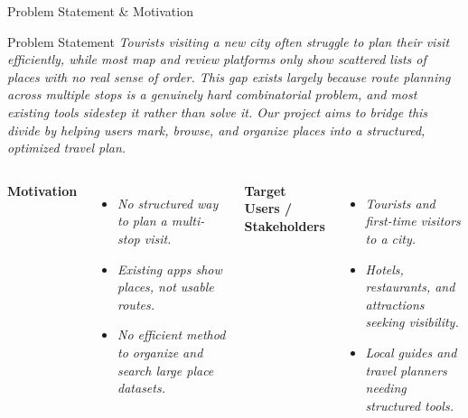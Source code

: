 \documentclass[aspectratio=169,10pt]{beamer}
\newcommand{\placeholder}[1]{\textit{\color{GEUGrey}#1}}
\begin{document}
\begin{frame}{Problem Statement \& Motivation}
\begin{block}{Problem Statement}
\placeholder{Tourists visiting a new city often struggle to plan their visit efficiently, while most map and review platforms only show scattered lists of places with no real sense of order. This gap exists largely because route planning across multiple stops is a genuinely hard combinatorial problem, and most existing tools sidestep it rather than solve it. Our project aims to bridge this divide by helping users mark, browse, and organize places into a structured, optimized travel plan.}
\end{block}
\vspace{1mm}
\begin{columns}[T,totalwidth=\textwidth]
\textbf{\color{GEUBlue}Motivation}
\begin{itemize}\itemsep1pt
\item \placeholder{No structured way to plan a multi-stop visit.}
\item \placeholder{Existing apps show places, not usable routes.}
\item \placeholder{No efficient method to organize and search large place datasets.}
\end{itemize}
\textbf{\color{GEUBlue}Target Users / Stakeholders}
\begin{itemize}\itemsep1pt
\item \placeholder{Tourists and first-time visitors to a city.}
\item \placeholder{Hotels, restaurants, and attractions seeking visibility.}
\item \placeholder{Local guides and travel planners needing structured tools.}
\end{itemize}
\end{columns}
\end{frame}
\end{document}
